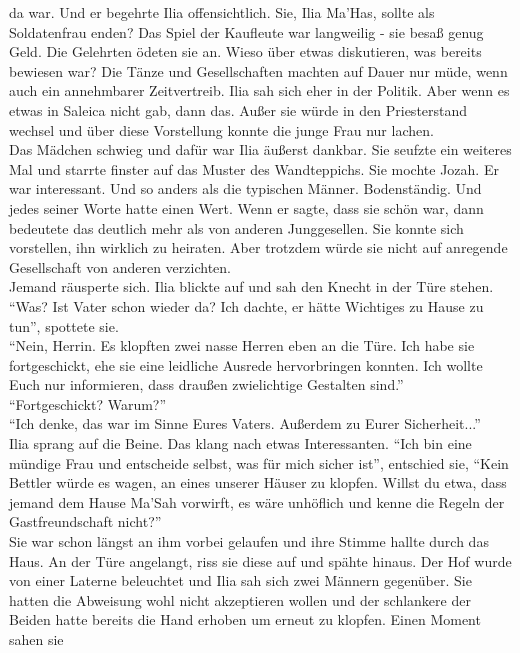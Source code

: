 da war. Und er begehrte Ilia offensichtlich. Sie, Ilia Ma'Has, sollte als Soldatenfrau enden? Das 
Spiel der Kaufleute war langweilig - sie besaß genug Geld. Die Gelehrten ödeten sie an. Wieso 
über etwas diskutieren, was bereits bewiesen war? Die Tänze und Gesellschaften machten auf Dauer 
nur müde, wenn auch ein annehmbarer Zeitvertreib. Ilia sah sich eher in der Politik. Aber wenn es 
etwas in Saleica nicht gab, dann das. Außer sie würde in den Priesterstand wechsel und über diese 
Vorstellung konnte die junge Frau nur lachen.\\
Das Mädchen schwieg und dafür war Ilia äußerst dankbar. Sie seufzte ein weiteres Mal und starrte 
finster auf das Muster des Wandteppichs. Sie mochte Jozah. Er war interessant. Und so anders als die 
typischen Männer. Bodenständig. Und jedes seiner Worte hatte einen Wert. Wenn er sagte, dass sie 
schön war, dann bedeutete das deutlich mehr als von anderen Junggesellen. Sie konnte sich 
vorstellen, ihn wirklich zu heiraten. Aber trotzdem würde sie nicht auf anregende Gesellschaft von 
anderen verzichten. \\
Jemand räusperte sich. Ilia blickte auf und sah den Knecht in der Türe stehen.\\
``Was? Ist Vater schon wieder da? Ich dachte, er hätte Wichtiges zu Hause zu tun'', spottete sie. \\
``Nein, Herrin. Es klopften zwei nasse Herren eben an die Türe. Ich habe sie fortgeschickt, ehe sie 
eine leidliche Ausrede hervorbringen konnten. Ich wollte Euch nur informieren, dass draußen 
zwielichtige Gestalten sind.''\\
``Fortgeschickt? Warum?'' \\
``Ich denke, das war im Sinne Eures Vaters. Außerdem zu Eurer Sicherheit...'' \\
Ilia sprang auf die Beine. Das klang nach etwas Interessanten. ``Ich bin eine mündige Frau und 
entscheide selbst, was für mich sicher 
ist'', entschied sie, ``Kein Bettler würde es wagen, an eines unserer Häuser zu klopfen. Willst du 
etwa, dass jemand dem Hause Ma'Sah vorwirft, es wäre unhöflich und kenne die Regeln der 
Gastfreundschaft nicht?'' \\
Sie war schon längst an ihm vorbei gelaufen und ihre Stimme hallte durch das Haus. An der Türe 
angelangt, riss sie diese auf und spähte hinaus. Der Hof wurde von einer Laterne beleuchtet und Ilia 
sah sich zwei Männern gegenüber. Sie hatten die Abweisung wohl nicht akzeptieren wollen und der 
schlankere der Beiden hatte bereits die Hand erhoben um erneut zu klopfen. Einen Moment sahen sie 
